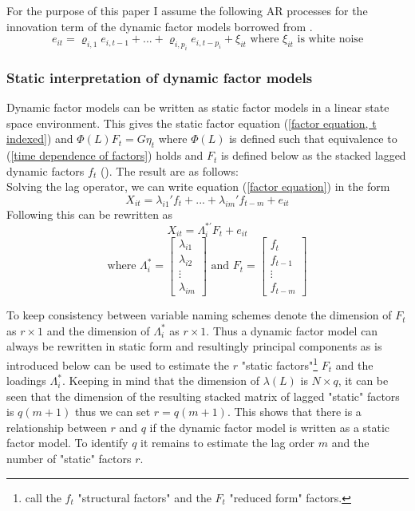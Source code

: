 \documentclass[12pt]{article}
\begin{document}
For the purpose of this paper I assume the following AR processes for the innovation term of the dynamic factor models borrowed from \citet{breitung2011testing}.
\begin{equation}
	\label{AR process innovation term}
	e_{it} = \varrho_{i,1} e_{i, t-1} + ... + \varrho_{i, p_i} e_{i, t-p_i} + \xi_{it} \text{ where $\xi_{it}$ is white noise}
\end{equation}


\subsubsection{Static interpretation of dynamic factor models}
\label{static interpretation of Dynamic factor models}
Dynamic factor models can be written as static factor models in a linear state space environment. This gives the static factor equation (\ref{factor equation, t indexed}) and $\Phi(L) F_t = G \eta_t$ where $\Phi(L)$ is defined such that equivalence to (\ref{time dependence of factors}) holds and $F_t$ is defined below as the stacked lagged dynamic factors $f_t$ (\citet{stock2011dynamic}). The result are as follows: \\

Solving the lag operator, we can write equation (\ref{factor equation}) in the form 
\begin{equation}
	\label{factor equation, solved lag polynomial}
	X_{it} = \lambda_{i1}' f_t + ... + \lambda_{im}' f_{t-m} + e_{it}
\end{equation}
Following \citet{bai2002determining} this can be rewritten as 
$$X_{it} = \Lambda_i^{*'} F_t + e_{it}$$
$$\text{where } \Lambda_i^* = \begin{bmatrix} \lambda_{i1} \\ \lambda_{i2} \\ \vdots \\ \lambda_{im} \end{bmatrix} \text{ and } F_t = \begin{bmatrix} f_t \\ f_{t-1} \\ \vdots \\ f_{t-m} \end{bmatrix}$$

To keep consistency between variable naming schemes denote the dimension of $F_t$ as $r \times 1$ and the dimension of $\Lambda_i^*$ as $r \times 1$. Thus a dynamic factor model can always be rewritten in static form and resultingly principal components as is introduced below can be used to estimate the $r$ "static factors"\footnote{\citet{breitung2004identification} call the $f_t$ "structural factors" and the $F_t$ "reduced form" factors.} $F_t$ and the loadings $\Lambda_i^*$.
Keeping in mind that the dimension of $\lambda(L)$ is $N \times q$, it can be seen that the dimension of the resulting stacked matrix of lagged "static" factors is $q(m+1)$ thus we can set $r=q(m+1)$. This shows that there is a relationship between $r$ and $q$ if the dynamic factor model is written as a static factor model. To identify $q$ it remains to estimate the lag order $m$ and the number of "static" factors $r$.
\end{document}
